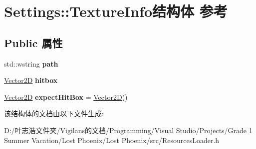 \hypertarget{struct_settings_1_1_texture_info}{}\section{Settings\+:\+:Texture\+Info结构体 参考}
\label{struct_settings_1_1_texture_info}
\subsection*{Public 属性}
\begin{DoxyCompactItemize}
\item 
\mbox{\label{struct_settings_1_1_texture_info_ae8163d14505552c69b973a262fb896f6}} 
std\+::wstring {\bfseries path}
\item 
\mbox{\label{struct_settings_1_1_texture_info_a5b7e1f0b9d305faa03de6d0c31cc0859}} 
\hyperlink{structbasic__vector2_d}{Vector2D} {\bfseries hitbox}
\item 
\mbox{\label{struct_settings_1_1_texture_info_a4bec21902818b3afb2993e5d67a62dfe}} 
\hyperlink{structbasic__vector2_d}{Vector2D} {\bfseries expect\+Hit\+Box} = \hyperlink{structbasic__vector2_d}{Vector2D}()
\end{DoxyCompactItemize}


该结构体的文档由以下文件生成\+:\begin{DoxyCompactItemize}
\item 
D\+:/叶志浩文件夹/\+Vigilans的文档/\+Programming/\+Visual Studio/\+Projects/\+Grade 1 Summer Vacation/\+Lost Phoenix/\+Lost Phoenix/src/Resources\+Loader.\+h\end{DoxyCompactItemize}
